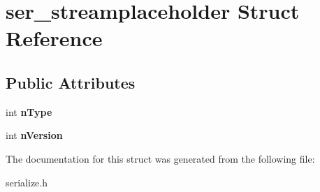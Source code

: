 \hypertarget{structser__streamplaceholder}{}\section{ser\+\_\+streamplaceholder Struct Reference}
\label{structser__streamplaceholder}
\subsection*{Public Attributes}
\begin{DoxyCompactItemize}
\item 
\mbox{\label{structser__streamplaceholder_a789184cb41dc03b494be3ea0d83d3c3c}} 
int {\bfseries n\+Type}
\item 
\mbox{\label{structser__streamplaceholder_adcc5fb4893156366e8491e37c59ecd87}} 
int {\bfseries n\+Version}
\end{DoxyCompactItemize}


The documentation for this struct was generated from the following file\+:\begin{DoxyCompactItemize}
\item 
serialize.\+h\end{DoxyCompactItemize}
